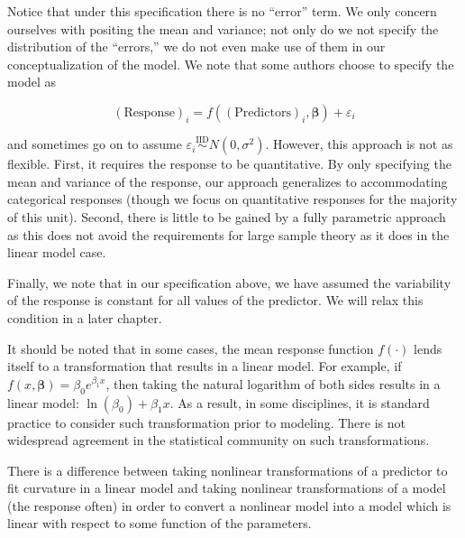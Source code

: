 \documentclass[
]{book}
\theoremstyle{plain}
\theoremstyle{mydefn}
\theoremstyle{myexmpl}
\theoremstyle{remark}
\begin{document}
Notice that under this specification there is no ``error'' term. We only concern ourselves with positing the mean and variance; not only do we not specify the distribution of the ``errors,'' we do not even make use of them in our conceptualization of the model. We note that some authors choose to specify the model as

\[(\text{Response})_i = f\left((\text{Predictors})_i, \boldsymbol{\beta}\right) + \varepsilon_i\]

and sometimes go on to assume \(\varepsilon_i \stackrel{\text{IID}}{\sim}N\left(0, \sigma^2\right)\). However, this approach is not as flexible. First, it requires the response to be quantitative. By only specifying the mean and variance of the response, our approach generalizes to accommodating categorical responses (though we focus on quantitative responses for the majority of this unit). Second, there is little to be gained by a fully parametric approach as this does not avoid the requirements for large sample theory as it does in the linear model case.

Finally, we note that in our specification above, we have assumed the variability of the response is constant for all values of the predictor. We will relax this condition in a later chapter.

It should be noted that in some cases, the mean response function \(f(\cdot)\) lends itself to a transformation that results in a linear model. For example, if \(f(x, \boldsymbol{\beta}) = \beta_0 e^{\beta_1 x}\), then taking the natural logarithm of both sides results in a linear model: \(\ln\left(\beta_0\right) + \beta_1 x\). As a result, in some disciplines, it is standard practice to consider such transformation prior to modeling. There is not widespread agreement in the statistical community on such transformations.

\begin{rmdwarning}
There is a difference between taking nonlinear transformations of a predictor to fit curvature in a linear model and taking nonlinear transformations of a model (the response often) in order to convert a nonlinear model into a model which is linear with respect to some function of the parameters.
\end{rmdwarning}
\end{document}
